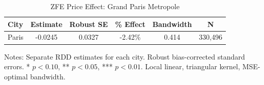 \begin{table}[H]
\centering
\caption{ZFE Price Effect: Grand Paris Metropole}
\begin{threeparttable}
\begin{tabular}{lccccc}
\toprule
City & Estimate & Robust SE & \% Effect & Bandwidth & N \\
\midrule
Paris  &  -0.0245  &  0.0327  &  -2.42\%  &  0.414  &  330,496  \\
\bottomrule
\end{tabular}
\begin{tablenotes}[flushleft]
\small
\item Notes: Separate RDD estimates for each city.  Robust bias-corrected standard errors.  * $p<0.10$, ** $p<0.05$, *** $p<0.01$.  Local linear, triangular kernel, MSE-optimal bandwidth.
\end{tablenotes}
\end{threeparttable}
\label{tab:cities}
\end{table}
